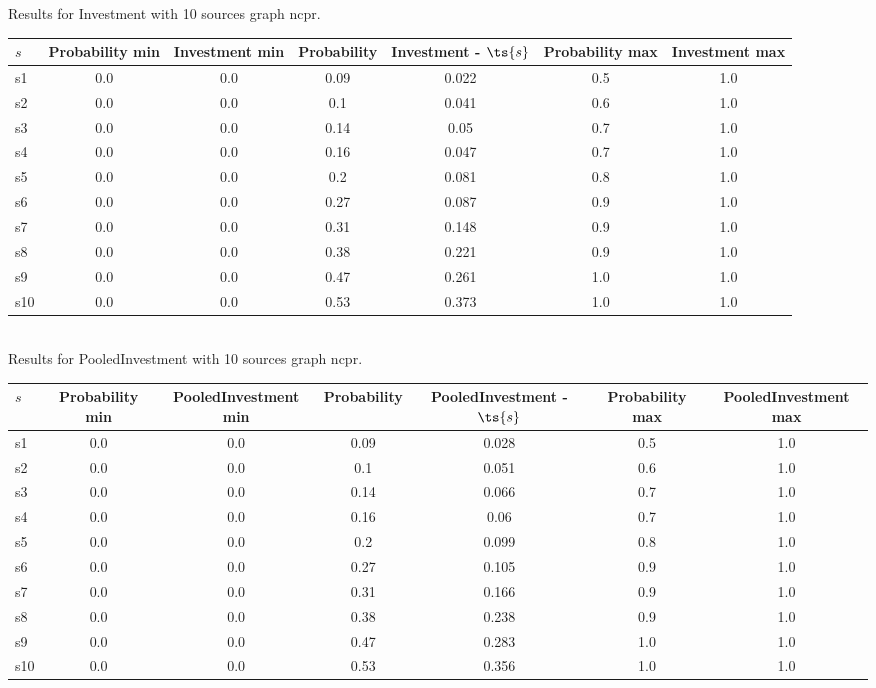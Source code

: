 \documentclass{article}
\begin{document}
\noindent Results for Investment with 10 sources graph ncpr.

\noindent\begin{tabular}{|l|c|c|c|c|c|c|}
\hline
$s$& Probability min & Investment min & Probability & Investment - $\ts{s}$ & Probability max & Investment max\\
\hline
s1 &0.0 & 0.0 & 0.09 & 0.022 & 0.5 & 1.0\\
\hline
s2 &0.0 & 0.0 & 0.1 & 0.041 & 0.6 & 1.0\\
\hline
s3 &0.0 & 0.0 & 0.14 & 0.05 & 0.7 & 1.0\\
\hline
s4 &0.0 & 0.0 & 0.16 & 0.047 & 0.7 & 1.0\\
\hline
s5 &0.0 & 0.0 & 0.2 & 0.081 & 0.8 & 1.0\\
\hline
s6 &0.0 & 0.0 & 0.27 & 0.087 & 0.9 & 1.0\\
\hline
s7 &0.0 & 0.0 & 0.31 & 0.148 & 0.9 & 1.0\\
\hline
s8 &0.0 & 0.0 & 0.38 & 0.221 & 0.9 & 1.0\\
\hline
s9 &0.0 & 0.0 & 0.47 & 0.261 & 1.0 & 1.0\\
\hline
s10 &0.0 & 0.0 & 0.53 & 0.373 & 1.0 & 1.0\\
\hline
\end{tabular}\\

\noindent Results for PooledInvestment with 10 sources graph ncpr.

\noindent\begin{tabular}{|l|c|c|c|c|c|c|}
\hline
$s$& Probability min & PooledInvestment min & Probability & PooledInvestment - $\ts{s}$ & Probability max & PooledInvestment max\\
\hline
s1 &0.0 & 0.0 & 0.09 & 0.028 & 0.5 & 1.0\\
\hline
s2 &0.0 & 0.0 & 0.1 & 0.051 & 0.6 & 1.0\\
\hline
s3 &0.0 & 0.0 & 0.14 & 0.066 & 0.7 & 1.0\\
\hline
s4 &0.0 & 0.0 & 0.16 & 0.06 & 0.7 & 1.0\\
\hline
s5 &0.0 & 0.0 & 0.2 & 0.099 & 0.8 & 1.0\\
\hline
s6 &0.0 & 0.0 & 0.27 & 0.105 & 0.9 & 1.0\\
\hline
s7 &0.0 & 0.0 & 0.31 & 0.166 & 0.9 & 1.0\\
\hline
s8 &0.0 & 0.0 & 0.38 & 0.238 & 0.9 & 1.0\\
\hline
s9 &0.0 & 0.0 & 0.47 & 0.283 & 1.0 & 1.0\\
\hline
s10 &0.0 & 0.0 & 0.53 & 0.356 & 1.0 & 1.0\\
\hline
\end{tabular}\\
\end{document}
